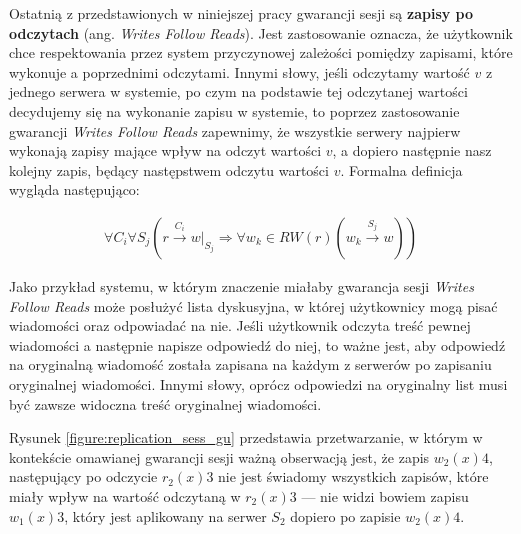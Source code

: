 Ostatnią z przedstawionych w niniejszej pracy gwarancji sesji są \textbf{zapisy po odczytach} (ang. \textit{Writes Follow Reads}). Jest zastosowanie oznacza, że użytkownik chce respektowania przez system przyczynowej zależości pomiędzy zapisami, które wykonuje a poprzednimi odczytami. Innymi słowy, jeśli odczytamy wartość $ v $ z jednego serwera w systemie, po czym na podstawie tej odczytanej wartości decydujemy się na wykonanie zapisu w systemie, to poprzez zastosowanie gwarancji \textit{Writes Follow Reads} zapewnimy, że wszystkie serwery najpierw wykonają zapisy mające wpływ na odczyt wartości $ v $, a dopiero następnie nasz kolejny zapis, będący następstwem odczytu wartości $ v $. Formalna definicja wygląda następująco:

\begin{align*}
    \forall{C_i} \forall{S_j} (r \xrightarrow{C_i} w|_{S_j} \Rightarrow \forall{w_k} \in RW(r) (w_k \xrightarrow{S_j} w))
\end{align*}

Jako przykład systemu, w którym znaczenie miałaby gwarancja sesji \textit{Writes Follow Reads} może posłużyć lista dyskusyjna, w której użytkownicy mogą pisać wiadomości oraz odpowiadać na nie. Jeśli użytkownik odczyta treść pewnej wiadomości a następnie napisze odpowiedź do niej, to ważne jest, aby odpowiedź na oryginalną wiadomość została zapisana na każdym z serwerów po zapisaniu oryginalnej wiadomości. Innymi słowy, oprócz odpowiedzi na oryginalny list musi być zawsze widoczna treść oryginalnej wiadomości.

Rysunek \ref{figure:replication_sess_gu} przedstawia przetwarzanie, w którym w kontekście omawianej gwarancji sesji ważną obserwacją jest, że zapis $ w_2(x)4 $, następujący po odczycie $ r_2(x)3 $ nie jest świadomy wszystkich zapisów, które miały wpływ na wartość odczytaną w $ r_2(x)3 $ --- nie widzi bowiem zapisu $ w_1(x)3 $, który jest aplikowany na serwer $ S_2 $ dopiero po zapisie $ w_2(x)4 $.